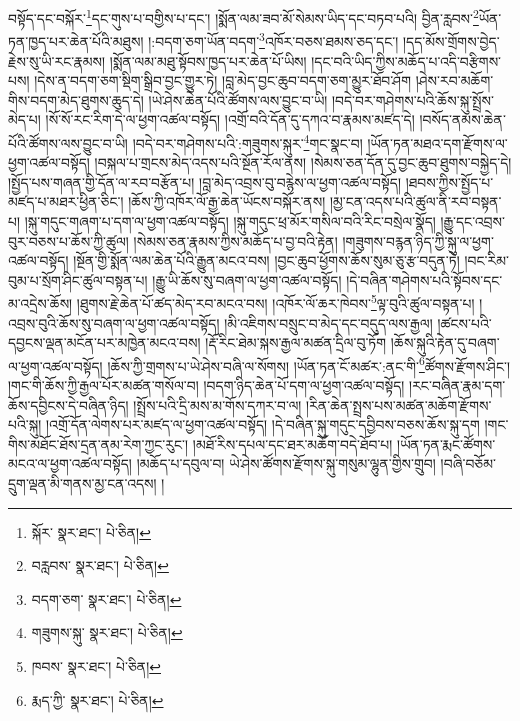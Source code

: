 བསྟོད་དང་བསྐོར་\footnote{སྐོར་  སྣར་ཐང་།  པེ་ཅིན། }དང་གུས་པ་བགྱིས་པ་དང་། །སྨོན་ལམ་ཟབ་མོ་སེམས་ཡིད་དང་བཏབ་པའི། བྱིན་རླབས་\footnote{བརླབས་  སྣར་ཐང་།  པེ་ཅིན། }ཡོན་ཏན་ཁྱད་པར་ཆེན་པོའི་མཐུས། །:བདག་ཅག་ཡོན་བདག་\footnote{བདག་ཅག་  སྣར་ཐང་།  པེ་ཅིན། }འཁོར་བཅས་ཐམས་ཅད་དང་། །དད་མོས་གྲོགས་བྱེད་རྗེས་སུ་ཡི་རང་རྣམས། །སྨོན་ལམ་མཐུ་སྟོབས་ཁྱད་པར་ཆེན་པོ་ཡིས། །དང་བའི་ཡིད་ཀྱིས་མཆོད་པ་འདི་བརྩིགས་པས། །དེས་ན་བདག་ཅག་སྡིག་སྒྲིབ་བྱང་གྱུར་ཏེ། །བླ་མེད་བྱང་ཆུབ་བདག་ཅག་མྱུར་ཐོབ་ཤོག །ཤེས་རབ་མཆོག་གིས་བདག་མེད་ཐུགས་ཆུད་དེ། །ཡེ་ཤེས་ཆེན་པོའི་ཚོགས་ལས་བྱུང་བ་ཡི། །བདེ་བར་གཤེགས་པའི་ཆོས་སྐུ་སྤྲོས་མེད་པ། །སོ་སོ་རང་རིག་དེ་ལ་ཕྱག་འཚལ་བསྟོད། །འགྲོ་བའི་དོན་དུ་དཀའ་བ་རྣམས་མཛད་དེ། །བསོད་ནམས་ཆེན་པོའི་ཚོགས་ལས་བྱུང་བ་ཡི། །བདེ་བར་གཤེགས་པའི་:གཟུགས་སྐུར་\footnote{གཟུགས་སྐུ་  སྣར་ཐང་།  པེ་ཅིན། }གང་སྣང་བ། །ཡོན་ཏན་མཐའ་དག་རྫོགས་ལ་ཕྱག་འཚལ་བསྟོད། །བསྐལ་པ་གྲངས་མེད་འདས་པའི་སྔོན་རོལ་ནས། །སེམས་ཅན་དོན་དུ་བྱང་ཆུབ་ཐུགས་བསྐྱེད་དེ། །སྤྱོད་པས་གཞན་གྱི་དོན་ལ་རབ་བརྩོན་པ། །བླ་མེད་འབྲས་བུ་བརྙེས་ལ་ཕྱག་འཚལ་བསྟོད། །ཐབས་ཀྱིས་སྤྱོད་པ་མཛད་པ་མཐར་ཕྱིན་ཅིང་། །ཆོས་ཀྱི་འཁོར་ལོ་རྒྱ་ཆེན་ཡོངས་བསྐོར་ནས། །མྱ་ངན་འདས་པའི་ཚུལ་ནི་རབ་བསྟན་པ། །སྐུ་གདུང་གཞག་པ་དག་ལ་ཕྱག་འཚལ་བསྟོད། །སྐུ་གདུང་ཕྲ་མོར་གསིལ་བའི་རིང་བསྲེལ་སྣོད། །རྒྱུ་དང་འབྲས་བུར་བཅས་པ་ཆོས་ཀྱི་ཚུལ། །སེམས་ཅན་རྣམས་ཀྱིས་མཆོད་པ་བྱ་བའི་རྟེན། །གཟུགས་བརྙན་ཉིད་ཀྱི་སྐུ་ལ་ཕྱག་འཚལ་བསྟོད། །སྔོན་གྱི་སྨོན་ལམ་ཆེན་པོའི་རྒྱུན་མངའ་བས། །བྱང་ཆུབ་ཕྱོགས་ཆོས་སུམ་ཅུ་རྩ་བདུན་ཏེ། །བང་རིམ་བུམ་པ་སྲོག་ཤིང་ཚུལ་བསྟན་པ། །རྒྱུ་ཡི་ཆོས་སུ་བཞག་ལ་ཕྱག་འཚལ་བསྟོད། །དེ་བཞིན་གཤེགས་པའི་སྟོབས་དང་མ་འདྲེས་ཆོས། །ཐུགས་རྗེ་ཆེན་པོ་ཚད་མེད་རབ་མངའ་བས། །འཁོར་ལོ་ཆར་ཁེབས་\footnote{ཁབས་  སྣར་ཐང་།  པེ་ཅིན། }ལྟ་བུའི་ཚུལ་བསྟན་པ། །འབྲས་བུའི་ཆོས་སུ་བཞག་ལ་ཕྱག་འཚལ་བསྟོད། །མི་འཇིགས་བསྲུང་བ་མེད་དང་བདུད་ལས་རྒྱལ། །ཚངས་པའི་དབྱངས་ལྡན་མངོན་པར་མཁྱེན་མངའ་བས། །རྡོ་རིང་ཐེམ་སྐས་རྒྱལ་མཚན་དྲིལ་བུ་ཏོག །ཆོས་སྐུའི་རྟེན་དུ་བཞག་ལ་ཕྱག་འཚལ་བསྟོད། །ཆོས་ཀྱི་གྲགས་པ་ཡེ་ཤེས་བཞི་ལ་སོགས། །ཡོན་ཏན་ངོ་མཚར་:ནང་གི་\footnote{རྨད་ཀྱི་  སྣར་ཐང་།  པེ་ཅིན། }ཚོགས་རྫོགས་ཤིང་། །གང་གི་ཆོས་ཀྱི་རྒྱལ་པོར་མཚན་གསོལ་བ། །བདག་ཉིད་ཆེན་པོ་དག་ལ་ཕྱག་འཚལ་བསྟོད། །རང་བཞིན་རྣམ་དག་ཆོས་དབྱིངས་དེ་བཞིན་ཉིད། །སྤྲོས་པའི་དྲི་མས་མ་གོས་དཀར་བ་ལ། །རིན་ཆེན་སྤྲས་པས་མཚན་མཆོག་རྫོགས་པའི་སྐུ། །འགྲོ་དོན་ལེགས་པར་མཛད་ལ་ཕྱག་འཚལ་བསྟོད། །དེ་བཞིན་སྐུ་གདུང་དབྱིབས་བཅས་ཆོས་སྐུ་དག །གང་གིས་མཐོང་ཐོས་དྲན་ནམ་རེག་ཀྱང་རུང་། །མཐོ་རིས་དཔལ་དང་ཐར་མཆོག་བདེ་ཐོབ་པ། །ཡོན་ཏན་རྨང་ཚོགས་མངའ་ལ་ཕྱག་འཚལ་བསྟོད། །མཆོད་པ་དབུལ་བ། ཡེ་ཤེས་ཚོགས་རྫོགས་སྐུ་གསུམ་ལྷུན་གྱིས་གྲུབ། །བཞི་བཅོམ་དྲུག་ལྡན་མི་གནས་མྱ་ངན་འདས། །
